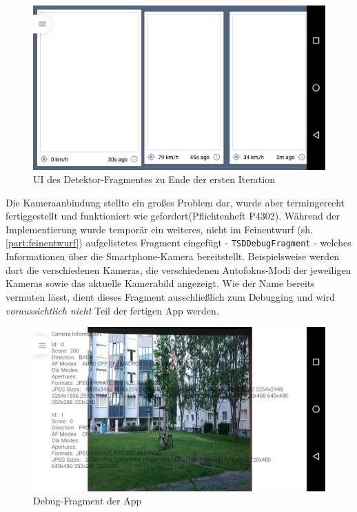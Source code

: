 \documentclass[12pt,a4paper,ngerman,enabledeprecatedfontcommands]{scrreprt}
\begin{document}
\begin{figure}[H]
\centering
\includegraphics[width=0.9\linewidth]{Reviewdokument/Grafiken/app_detector_screenshot_old.png}
\caption{\gls{UI} des Detektor-Fragmentes zu Ende der ersten Iteration}
\label{fig:detektor_ui}
\end{figure}

Die Kameraanbindung stellte ein großes Problem dar, wurde aber termingerecht fertiggestellt und funktioniert wie gefordert(Pflichtenheft P4302). Während der Implementierung wurde temporär ein weiteres, nicht im Feinentwurf (sh. \cref{part:feinentwurf}) aufgelistetes Fragment eingefügt - \texttt{TSDDebugFragment} - welches Informationen über die \gls{Smartphone}-Kamera bereitstellt. Beispielsweise werden dort die verschiedenen Kameras, die verschiedenen Autofokus-Modi der jeweiligen Kameras sowie das aktuelle Kamerabild angezeigt. Wie der Name bereits vermuten lässt, dient dieses Fragment ausschließlich zum Debugging und wird \textit{voraussichtlich nicht} Teil der fertigen \gls{App} werden.\\

\begin{figure}[H]
\centering
\includegraphics[width=0.9\linewidth]{Reviewdokument/Grafiken/app_debug_screenshot.png}
\caption{Debug-Fragment der App}
\end{figure}
\end{document}
